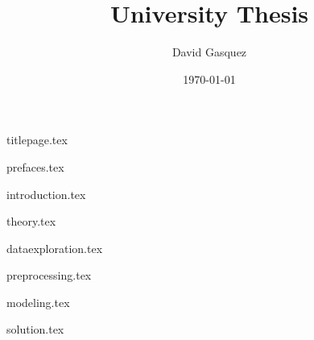 \documentclass[
    a4paper,
    12pt
]{report}
\title{University Thesis}
\author{David Gasquez}
\date{\today}
\begin{document}
{titlepage.tex}

{prefaces.tex}

{introduction.tex}

{theory.tex}

{dataexploration.tex}

{preprocessing.tex}

{modeling.tex}

{solution.tex}
\end{document}
